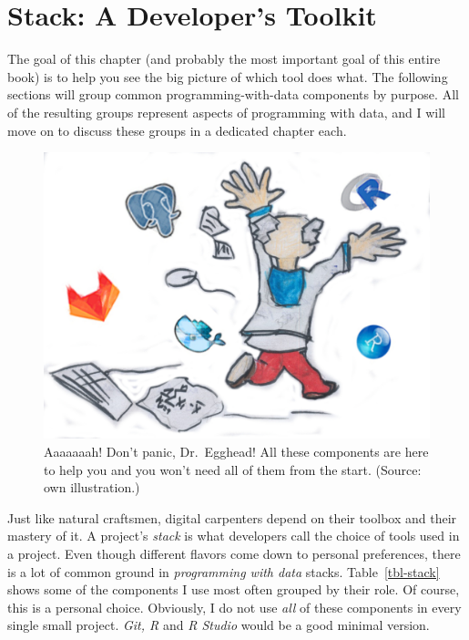 \documentclass[
  12pt,
  letterpaper,
]{krantz}
\begin{document}

\hypertarget{stack-a-developers-toolkit}{%
\chapter{\texorpdfstring{Stack: A Developer's
Toolkit}{Stack: A Developer's Toolkit}}\label{stack-a-developers-toolkit}}

The goal of this chapter (and probably the most important goal of this
entire book) is to help you see the big picture of
which tool does what. The following sections will group common
programming-with-data components by purpose. All of the resulting groups
represent aspects of programming with data, and I will move on to
discuss these groups in a dedicated chapter each.

\begin{figure}

{\centering \includegraphics{./images/dr_egghead_panics.jpg}

}

\caption{Aaaaaaah! Don't panic, Dr.~Egghead! All these components are
here to help you and you won't need all of them from the start. (Source:
own illustration.)}

\end{figure}

Just like natural craftsmen, digital carpenters depend on their toolbox
and their mastery of it. A project's \emph{stack} is what
developers call the choice of tools used in a project. Even though
different flavors come down to personal preferences, there is a lot of
common ground in \emph{programming with data} stacks.
Table~\ref{tbl-stack} shows some of the components I use most often
grouped by their role. Of course, this is a personal choice. Obviously,
I do not use \emph{all} of these components in every single small
project. \emph{Git, R} and \emph{R Studio} would be a good minimal
version.
\end{document}

